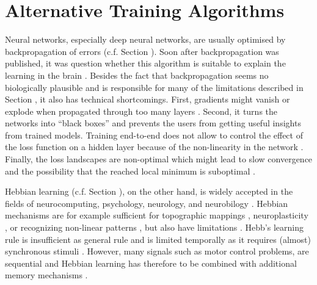 \section{Alternative Training Algorithms}
Neural networks, especially deep neural networks, are usually optimised by backpropagation of errors (c.f. Section ).
Soon after backpropagation was published, it was question whether this algorithm is suitable to explain the learning in the brain .
Besides the fact that backpropagation seems no biologically plausible and is responsible for many of the limitations described in Section , it also has technical shortcomings.
First, gradients might vanish or explode when propagated through too many layers .
Second, it turns the networks into ``black boxes'' and prevents the users from getting useful insights from trained models.
Training end-to-end does not allow to control the effect of the loss function on a hidden layer because of the non-linearity in the network .
Finally, the loss landscapes are non-optimal which might lead to slow convergence and the possibility that the reached local minimum is suboptimal .

Hebbian learning (c.f. Section ), on the other hand, is widely accepted in the fields of neurocomputing, psychology, neurology, and neurobilogy .
Hebbian mechanisms are for example sufficient for topographic mappings , neuroplasticity , or recognizing non-linear patterns , but also have limitations .
Hebb's learning rule is insufficient as general rule and is limited temporally as it requires (almost) synchronous stimuli \cite{Anderson_1998}.
However, many signals such as motor control problems, are sequential and Hebbian learning has therefore to be combined with additional memory mechanisms .

